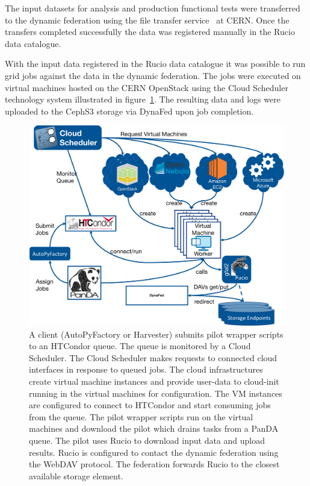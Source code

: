 \documentclass[a4paper]{jpconf}
\begin{document}
The input datasets for analysis and production functional tests were transferred to the dynamic federation using the file transfer service~\cite{fts3} at CERN. Once the transfers completed successfully the data was registered manually in the Rucio data catalogue.

With the input data registered in the Rucio data catalogue it was possible to run grid jobs against the data in the dynamic federation. The jobs were executed on virtual machines hosted on the CERN OpenStack using the Cloud Scheduler technology system illustrated in figure~\ref{fig:atlas-cloud}. The resulting data and logs were uploaded to the CephS3 storage via DynaFed upon job completion.

\begin{figure}
  \includegraphics[width=\textwidth]{atlas-cloud-system.png}
  \caption{A client (AutoPyFactory or Harvester) submits pilot wrapper scripts to an HTCondor queue. The queue is monitored by a Cloud Scheduler. The Cloud Scheduler makes requests to connected cloud interfaces in response to queued jobs. The cloud infrastructures create virtual machine instances and provide user-data to cloud-init running in the virtual machines for configuration. The VM instances are configured to connect to HTCondor and start consuming jobs from the queue. The pilot wrapper scripts run on the virtual machines and download the pilot which drains tasks from a PanDA queue. The pilot uses Rucio to download input data and upload results. Rucio is configured to contact the dynamic federation using the WebDAV protocol. The federation forwards Rucio to the closest available storage element.}
  \label{fig:atlas-cloud}
\end{figure}
\end{document}
